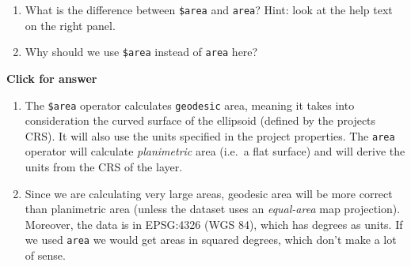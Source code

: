 \documentclass[
  letterpaper,
  DIV=11,
  numbers=noendperiod]{scrreprt}
\begin{document}
\begin{tcolorbox}[enhanced jigsaw, breakable, toptitle=1mm, colback=white, left=2mm, leftrule=.75mm, titlerule=0mm, colframe=quarto-callout-important-color-frame, opacityback=0, title=\textcolor{quarto-callout-important-color}{\faExclamation}\hspace{0.5em}{Stop and Think}, toprule=.15mm, opacitybacktitle=0.6, bottomtitle=1mm, colbacktitle=quarto-callout-important-color!10!white, bottomrule=.15mm, coltitle=black, rightrule=.15mm, arc=.35mm]

\begin{enumerate}
\def\labelenumi{\alph{enumi})}
\item
  What is the difference between \texttt{\$area} and \texttt{area}?
  Hint: look at the help text on the right panel.
\item
  Why should we use \texttt{\$area} instead of \texttt{area} here?
\end{enumerate}

\end{tcolorbox}

\begin{tcolorbox}[enhanced jigsaw, leftrule=.75mm, colframe=quarto-callout-important-color-frame, breakable, toprule=.15mm, bottomrule=.15mm, arc=.35mm, rightrule=.15mm, opacityback=0, colback=white, left=2mm]

\vspace{-3mm}\textbf{Click for answer}\vspace{3mm}

\begin{enumerate}
\def\labelenumi{\alph{enumi})}
\item
  The \texttt{\$area} operator calculates \texttt{geodesic} area,
  meaning it takes into consideration the curved surface of the
  ellipsoid (defined by the projects CRS). It will also use the units
  specified in the project properties. The \texttt{area} operator will
  calculate \emph{planimetric} area (i.e.~a flat surface) and will
  derive the units from the CRS of the layer.
\item
  Since we are calculating very large areas, geodesic area will be more
  correct than planimetric area (unless the dataset uses an
  \emph{equal-area} map projection). Moreover, the data is in EPSG:4326
  (WGS 84), which has degrees as units. If we used \texttt{area} we
  would get areas in squared degrees, which don't make a lot of sense.
\end{enumerate}

\end{tcolorbox}
\end{document}
